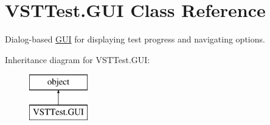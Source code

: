 \hypertarget{class_v_s_t_test_1_1_g_u_i}{}\section{V\+S\+T\+Test.\+G\+UI Class Reference}
\label{class_v_s_t_test_1_1_g_u_i}


Dialog-\/based \hyperlink{class_v_s_t_test_1_1_g_u_i}{G\+UI} for displaying test progress and navigating options.  


Inheritance diagram for V\+S\+T\+Test.\+G\+UI\+:\begin{figure}[H]
\begin{center}
\leavevmode
\includegraphics[height=2.000000cm]{class_v_s_t_test_1_1_g_u_i}
\end{center}
\end{figure}
